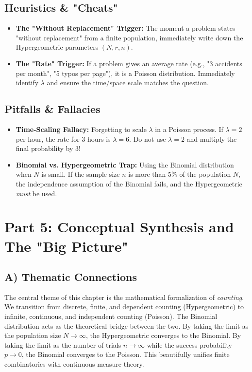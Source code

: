 \documentclass[11pt]{article}
\theoremstyle{definition}
\theoremstyle{remark}
\begin{document}
\subsection{Heuristics \& "Cheats"}
\begin{itemize}
    \item \textbf{The "Without Replacement" Trigger:} The moment a problem states "without replacement" from a finite population, immediately write down the Hypergeometric parameters $(N, r, n)$.
    \item \textbf{The "Rate" Trigger:} If a problem gives an average rate (e.g., "3 accidents per month", "5 typos per page"), it is a Poisson distribution. Immediately identify $\lambda$ and ensure the time/space scale matches the question.
\end{itemize}

\subsection{Pitfalls \& Fallacies}
\begin{itemize}
    \item \textbf{Time-Scaling Fallacy:} Forgetting to scale $\lambda$ in a Poisson process. If $\lambda = 2$ per hour, the rate for 3 hours is $\lambda = 6$. Do not use $\lambda = 2$ and multiply the final probability by 3!
    \item \textbf{Binomial vs. Hypergeometric Trap:} Using the Binomial distribution when $N$ is small. If the sample size $n$ is more than $5\%$ of the population $N$, the independence assumption of the Binomial fails, and the Hypergeometric \textit{must} be used.
\end{itemize}

\newpage
\section{Part 5: Conceptual Synthesis and The "Big Picture"}

\subsection{A) Thematic Connections}
The central theme of this chapter is the mathematical formalization of \textit{counting}. We transition from discrete, finite, and dependent counting (Hypergeometric) to infinite, continuous, and independent counting (Poisson). The Binomial distribution acts as the theoretical bridge between the two. By taking the limit as the population size $N \to \infty$, the Hypergeometric converges to the Binomial. By taking the limit as the number of trials $n \to \infty$ while the success probability $p \to 0$, the Binomial converges to the Poisson. This beautifully unifies finite combinatorics with continuous measure theory.
\end{document}
